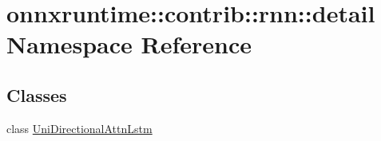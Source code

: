 \hypertarget{namespaceonnxruntime_1_1contrib_1_1rnn_1_1detail}{}\section{onnxruntime\+:\+:contrib\+:\+:rnn\+:\+:detail Namespace Reference}
\label{namespaceonnxruntime_1_1contrib_1_1rnn_1_1detail}
\subsection*{Classes}
\begin{DoxyCompactItemize}
\item 
class \mbox{\hyperlink{classonnxruntime_1_1contrib_1_1rnn_1_1detail_1_1UniDirectionalAttnLstm}{Uni\+Directional\+Attn\+Lstm}}
\end{DoxyCompactItemize}
